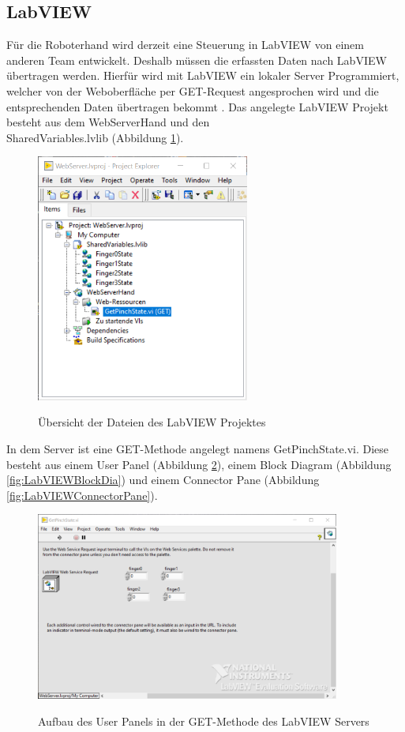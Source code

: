 \documentclass[a4paper,12pt,final]{article} %
\numberwithin{equation}{section} %
\numberwithin{figure}{section} %
\numberwithin{table}{section} %
\begin{document}
\subsection{LabVIEW}
Für die Roboterhand wird derzeit eine Steuerung in LabVIEW von einem anderen Team entwickelt. 
Deshalb müssen die erfassten Daten nach LabVIEW übertragen werden. Hierfür wird mit LabVIEW ein lokaler Server Programmiert, welcher von der Weboberfläche per GET-Request angesprochen wird und die entsprechenden Daten übertragen bekommt \cite{NIwebserverTutorial}.
Das angelegte LabVIEW Projekt besteht aus dem WebServerHand und den \\SharedVariables.lvlib (Abbildung \ref{fig:ProjektExplorer}).
\begin{figure}[H]
	\begin{center}
		\includegraphics[width=7cm]{Bilder/ProjektExplorer.png}
		\label{fig:ProjektExplorer}
		\caption{Übersicht der Dateien des LabVIEW Projektes}
	\end{center}
\end{figure}
In dem Server ist eine GET-Methode angelegt namens GetPinchState.vi. Diese besteht aus einem User Panel (Abbildung \ref{fig:LabVIEWuserPanel}), einem Block Diagram (Abbildung \ref{fig:LabVIEWBlockDia}) und einem Connector Pane (Abbildung \ref{fig:LabVIEWConnectorPane}).
\begin{figure}[H]
	\begin{center}
		\includegraphics[width=10cm]{Bilder/UserPanel.png}
		\label{fig:LabVIEWuserPanel}
		\caption{Aufbau des User Panels in der GET-Methode des LabVIEW Servers}
	\end{center}
\end{figure}  
\end{document}
